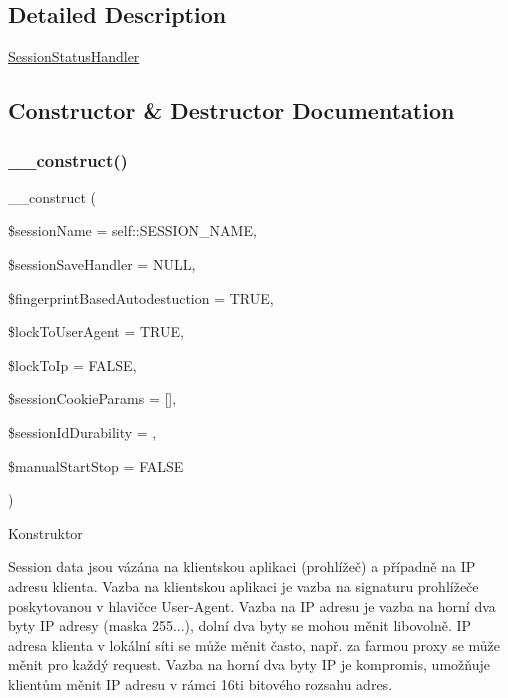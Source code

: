 \subsection{Detailed Description}
\mbox{\hyperlink{class_pes_1_1_session_1_1_session_status_handler}{Session\+Status\+Handler}} 

\subsection{Constructor \& Destructor Documentation}
\mbox{\label{class_pes_1_1_session_1_1_session_status_handler_a77699dabe8607f31e083c19fb1063a15}} 
\subsubsection{\texorpdfstring{\+\_\+\+\_\+construct()}{\_\_construct()}}
{\footnotesize\ttfamily \+\_\+\+\_\+construct (\begin{DoxyParamCaption}\item[{}]{\$session\+Name = {\ttfamily self\+:\+:SESSION\+\_\+NAME},  }\item[{\textbackslash{}Session\+Handler\+Interface}]{\$session\+Save\+Handler = {\ttfamily NULL},  }\item[{}]{\$fingerprint\+Based\+Autodestuction = {\ttfamily TRUE},  }\item[{}]{\$lock\+To\+User\+Agent = {\ttfamily TRUE},  }\item[{}]{\$lock\+To\+Ip = {\ttfamily FALSE},  }\item[{array}]{\$session\+Cookie\+Params = {\ttfamily \mbox{[}\mbox{]}},  }\item[{}]{\$session\+Id\+Durability = {},  }\item[{}]{\$manual\+Start\+Stop = {\ttfamily FALSE} }\end{DoxyParamCaption})}

Konstruktor

Session data jsou vázána na klientskou aplikaci (prohlížeč) a případně na IP adresu klienta. Vazba na klientskou aplikaci je vazba na signaturu prohlížeče poskytovanou v hlavičce User-\/\+Agent. Vazba na IP adresu je vazba na horní dva byty IP adresy (maska 255...), dolní dva byty se mohou měnit libovolně. IP adresa klienta v lokální síti se může měnit často, např. za farmou proxy se může měnit pro každý request. Vazba na horní dva byty IP je kompromis, umožňuje klientům měnit IP adresu v rámci 16ti bitového rozsahu adres.

